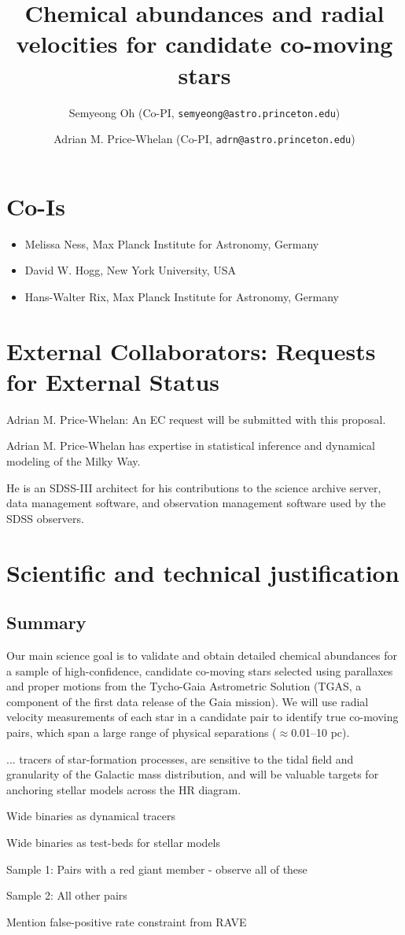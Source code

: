 \documentclass[11pt]{article}
\title{Chemical abundances and radial velocities for candidate co-moving stars}
\author{
  Semyeong Oh (Co-PI, \texttt{semyeong@astro.princeton.edu})
  \and
  Adrian M. Price-Whelan (Co-PI, \texttt{adrn@astro.princeton.edu})
}
\date{}
\begin{document}
\maketitle

\section*{Co-Is}

\begin{itemize}
    \item Melissa Ness, Max Planck Institute for Astronomy, Germany
    \item David W. Hogg, New York University, USA
    \item Hans-Walter Rix, Max Planck Institute for Astronomy, Germany
\end{itemize}

\section*{External Collaborators: Requests for External Status}

Adrian M. Price-Whelan: An EC request will be submitted with this proposal.

Adrian M. Price-Whelan has expertise in statistical inference and dynamical
modeling of the Milky Way.

He is an SDSS-III architect for his contributions to the
science archive server, data management software, and observation management
software used by the SDSS observers.

\section{Scientific and technical justification}

\subsection{Summary}

Our main science goal is to validate and obtain detailed chemical abundances for
a sample of high-confidence, candidate co-moving stars selected using parallaxes
and proper motions from the Tycho-Gaia Astrometric Solution (TGAS, a component
of the first data release of the Gaia mission).
We will use radial velocity measurements of each star in a candidate pair to
identify true co-moving pairs, which span a large range of physical separations
($\approx$0.01--10 pc).

... tracers of star-formation processes, are
sensitive to the tidal field and granularity of the Galactic mass distribution,
and will be valuable targets for anchoring stellar models across the HR diagram.

Wide binaries as dynamical tracers

Wide binaries as test-beds for stellar models

Sample 1: Pairs with a red giant member - observe all of these

Sample 2: All other pairs

Mention false-positive rate constraint from RAVE
\end{document}
